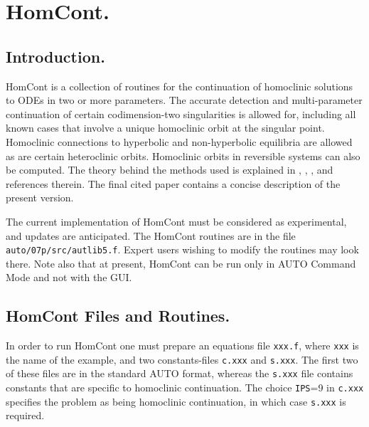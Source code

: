 \documentclass[12pt]{report}
\begin{document}
\chapter{ {\cal HomCont}.} \label{ch:HomCont}
\section{ Introduction.} \label{sec:HomCont_Intro}
{\cal HomCont} is a collection of routines for the continuation 
of homoclinic solutions to ODEs in two or more parameters.
The accurate detection and multi-parameter continuation of certain
codimension-two singularities is allowed for, including all known
cases that involve a unique homoclinic orbit at the singular point.
Homoclinic connections to hyperbolic and non-hyperbolic equilibria are 
allowed as are certain heteroclinic orbits. 
Homoclinic orbits in reversible systems can also be computed.
The theory behind the methods used is
explained in , ,
 \citeyear{Sa:95,Sa:95a},  and
references therein.  The final cited paper contains a concise
description of the present version. 

The current implementation of {\cal HomCont} must be considered as experimental,
and updates are anticipated.
The {\cal HomCont} routines are in the file {\tt auto/07p/src/autlib5.f}. 
Expert users wishing to modify the routines may look there.
Note also that at present, {\cal HomCont} can be run only in 
{\cal AUTO} Command Mode and not with the GUI. 


\section{{\cal HomCont} Files and Routines.} \label{sec:HomCont_files}

In order to run {\cal HomCont} one must prepare an equations file {\tt xxx.f}, 
where {\tt xxx} is the name of the example, 
and two constants-files {\tt c.xxx} and {\tt s.xxx}.
The first two of these files are in the standard {\cal AUTO} format, 
whereas the {\tt s.xxx} file
contains constants that are specific to homoclinic continuation.
The choice {\tt IPS}=9 in {\tt c.xxx} specifies the problem as
being homoclinic continuation, in which case {\tt s.xxx} is required.
\end{document}
